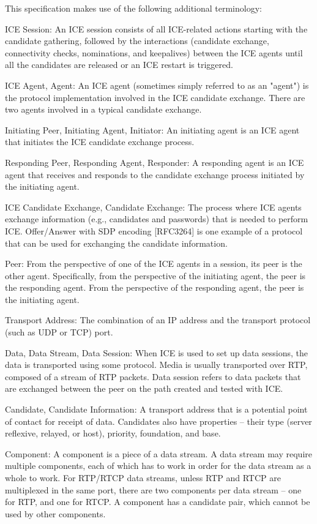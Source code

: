 \documentclass{article}
\begin{document}
This specification makes use of the following additional terminology:

ICE Session:  An ICE session consists of all ICE-related actions starting with the candidate gathering, followed by the interactions (candidate exchange, connectivity checks, nominations, and keepalives) between the ICE agents until all the candidates are released or an ICE restart is triggered.

ICE Agent, Agent:  An ICE agent (sometimes simply referred to as an "agent") is the protocol implementation involved in the ICE candidate exchange.  There are two agents involved in a typical candidate exchange.

Initiating Peer, Initiating Agent, Initiator:  An initiating agent is an ICE agent that initiates the ICE candidate exchange process.

Responding Peer, Responding Agent, Responder:  A responding agent is an ICE agent that receives and responds to the candidate exchange process initiated by the initiating agent.

ICE Candidate Exchange, Candidate Exchange:  The process where ICE agents exchange information (e.g., candidates and passwords) that is needed to perform ICE.  Offer/Answer with SDP encoding [RFC3264] is one example of a protocol that can be used for exchanging the candidate information.

Peer:  From the perspective of one of the ICE agents in a session, its peer is the other agent.  Specifically, from the perspective of the initiating agent, the peer is the responding agent.  From the perspective of the responding agent, the peer is the initiating agent.

Transport Address:  The combination of an IP address and the transport protocol (such as UDP or TCP) port.

Data, Data Stream, Data Session:  When ICE is used to set up data sessions, the data is transported using some protocol.  Media is usually transported over RTP, composed of a stream of RTP packets. Data session refers to data packets that are exchanged between the peer on the path created and tested with ICE.

Candidate, Candidate Information:  A transport address that is a potential point of contact for receipt of data.  Candidates also have properties -- their type (server reflexive, relayed, or host), priority, foundation, and base.

Component:  A component is a piece of a data stream.  A data stream may require multiple components, each of which has to work in order for the data stream as a whole to work.  For RTP/RTCP data streams, unless RTP and RTCP are multiplexed in the same port, there are two components per data stream -- one for RTP, and one for RTCP.  A component has a candidate pair, which cannot be used by other components.
\end{document}
